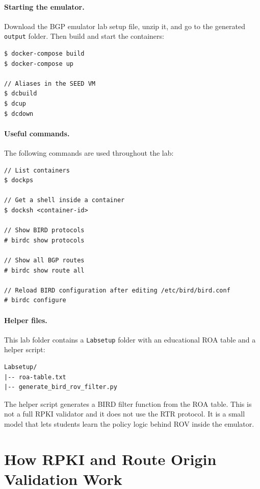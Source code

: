 \paragraph{Starting the emulator.}
Download the BGP emulator lab setup file, unzip it, and go to the generated
\texttt{output} folder. Then build and start the containers:

\begin{lstlisting}
$ docker-compose build
$ docker-compose up

// Aliases in the SEED VM
$ dcbuild
$ dcup
$ dcdown
\end{lstlisting}

\paragraph{Useful commands.}
The following commands are used throughout the lab:

\begin{lstlisting}
// List containers
$ dockps

// Get a shell inside a container
$ docksh <container-id>

// Show BIRD protocols
# birdc show protocols

// Show all BGP routes
# birdc show route all

// Reload BIRD configuration after editing /etc/bird/bird.conf
# birdc configure
\end{lstlisting}

\paragraph{Helper files.}
This lab folder contains a \texttt{Labsetup} folder with an educational ROA
table and a helper script:

\begin{lstlisting}
Labsetup/
|-- roa-table.txt
|-- generate_bird_rov_filter.py
\end{lstlisting}

The helper script generates a BIRD filter function from the ROA table. This is
not a full RPKI validator and it does not use the RTR protocol. It is a small
model that lets students learn the policy logic behind ROV inside the emulator.


\section{How RPKI and Route Origin Validation Work}


